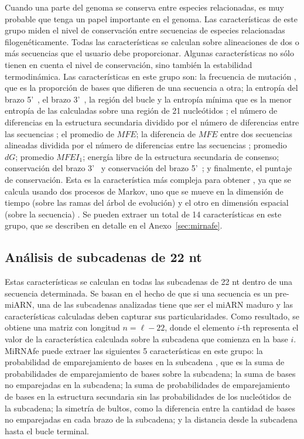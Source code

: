 Cuando una parte del genoma se conserva entre especies relacionadas, es muy probable que tenga un papel importante en el genoma. Las características de este
grupo miden el nivel de conservación entre secuencias de especies relacionadas filogenéticamente. Todas las características se calculan sobre alineaciones de
dos o más secuencias que el usuario debe proporcionar. Algunas características no sólo tienen en cuenta el nivel de conservación, sino también la estabilidad
termodinámica. Las características en este grupo son: la frecuencia de mutación \citep{huang2007mirfinder}, que es la proporción de bases que difieren de una
secuencia a otra; la entropía del brazo 5\textquoteright~, el brazo 3\textquoteright~, la región del bucle y la entropía
mínima que es la menor entropía de las calculadas sobre una región de 21 nucleótidos \citep{hertel2006hairpins}; el número de diferencias en la estructura
secundaria dividido por el número de diferencias entre las secuencias \citep{huang2007mirfinder}; el promedio de $MFE$; la diferencia de $MFE$ entre dos
secuencias alineadas dividida por el número de diferencias entre las secuencias \citep{huang2007mirfinder}; promedio $dG$; promedio $ MFEI_{1} $; energía libre
de la estructura secundaria de consenso; conservación del brazo 3\textquoteright~ y conservación del brazo 5\textquoteright~; y finalmente, el puntaje de
conservación. Esta es la característica más compleja para obtener \citep{terai2007mirrim}, ya que se calcula usando dos procesos de Markov, uno que se mueve en
la dimensión de tiempo (sobre las ramas del árbol de evolución) y el otro en dimensión espacial (sobre la secuencia) . Se pueden extraer un total de 14
características en este grupo, que se describen en detalle en el Anexo~\ref{sec:mirnafe}.

\subsection{Análisis de subcadenas de 22 nt}

Estas características se calculan en todas las subcadenas de 22 nt dentro de una secuencia determinada. Se basan en el hecho de que si una secuencia es un
pre-miARN, una de las subcadenas analizadas tiene que ser el miARN maduro y las características calculadas deben capturar sus particularidades. Como
resultado, se obtiene una matriz con longitud $ n = \ell - 22 $, donde el elemento $i$-th representa el valor de la característica calculada sobre la
subcadena que comienza en la base $i$. MiRNAfe puede extraer las siguientes 5 características en este grupo: la probabilidad de emparejamiento de bases en la
subcadena \citep{lim2003}, que es la suma de probabilidades de emparejamiento de bases sobre la subcadena; la suma de bases no emparejadas en la subcadena; la
suma de probabilidades de emparejamiento de bases en la estructura secundaria sin las probabilidades de los nucleótidos de la subcadena; la simetría de
bultos, como la diferencia entre la cantidad de bases no emparejadas en cada brazo de la subcadena; y la distancia desde la subcadena hasta el bucle terminal.

